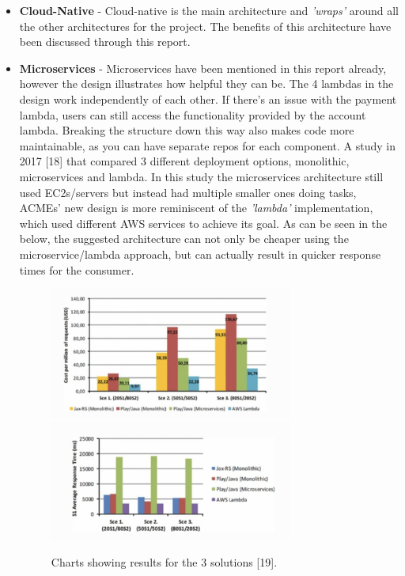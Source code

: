   \begin{itemize}
    \item \textbf{Cloud-Native} - Cloud-native is the main architecture and \textit{'wraps'} around all the other architectures for the project. The benefits
    of this architecture have been discussed through this report.

    \item \textbf{Microservices} - Microservices have been mentioned in this report already, however the design illustrates how helpful they can be. The 4 
    lambdas in the design work independently of each other. If there's an issue with the payment lambda, users can still access the functionality provided by 
    the account lambda. Breaking the structure down this way also makes code more maintainable, as you can have separate repos for each component. A study 
    in 2017 [18] that compared 3 different deployment options, monolithic, microservices and lambda. In this study the microservices architecture still used
    EC2s/servers but instead had multiple smaller ones doing tasks, ACMEs' new design is more reminiscent of the \textit{'lambda'} implementation, which used
    different AWS services to achieve its goal. As can be seen in the below, the suggested architecture can not only be cheaper using the microservice/lambda 
    approach, but can actually result in quicker response times for the consumer.
    
    \begin{figure}[H]
      \centering
      \includegraphics[width=8cm]{assets/costComparison.png}
      \includegraphics[width=8cm]{assets/responseTimeComparison.png}
      \caption{Charts showing results for the 3 solutions [19].}
      \label{fig:costComparison}
    \end{figure}


\end{itemize}
